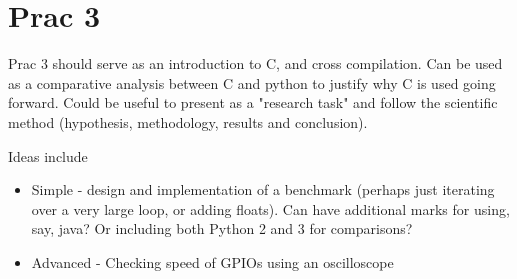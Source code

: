 \section{Prac 3}
Prac 3 should serve as an introduction to C, and cross compilation. Can be used as a comparative analysis between C and python to justify why C is used going forward. Could be useful to present as a "research task" and follow the scientific method (hypothesis, methodology, results and conclusion).

Ideas include 
\begin{itemize}
    \item Simple - design and implementation of a benchmark (perhaps just iterating over a very large loop, or adding floats). Can have additional marks for using, say, java? Or including both Python 2 and 3 for comparisons?
    
    \item Advanced - Checking speed of GPIOs using an oscilloscope
\end{itemize}

